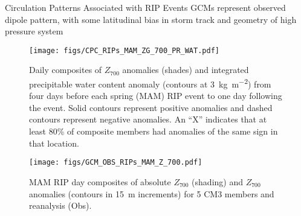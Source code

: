 \begin{block}{Circulation Patterns Associated with RIP Events}
  GCMs represent observed dipole pattern, with some latitudinal bias in storm track and geometry of high pressure system
  \begin{figure}[ht]
    \centerline{\texttt{[image: figs/CPC\_RIPs\_MAM\_ZG\_700\_PR\_WAT.pdf]}}
    \caption{
      Daily composites of $Z_{700}$ anomalies (shades) and integrated precipitable water content anomaly (contours at \SI{3}{\kilo\gram\per\square\meter}) from four days before each spring (MAM) RIP event to one day following the event.
      Solid contours represent positive anomalies and dashed contours represent negative anomalies.
      An ``X'' indicates that at least 80\% of composite members had anomalies of the same sign in that location.
    }
    \label{fig:MAM-gph-pr-wat}
  \end{figure}
  \begin{figure}[ht]
    \centerline{\texttt{[image: figs/GCM\_OBS\_RIPs\_MAM\_Z\_700.pdf]}}
    \caption{
      MAM RIP day composites of absolute $Z_{700}$ (shading) and $Z_{700}$ anomalies (contours in \SI{15}{\meter} increments) for 5 CM3 members and reanalysis (Obs).
    }
    \label{fig:MAM-mod-obs-gph}
  \end{figure}
\end{block}
